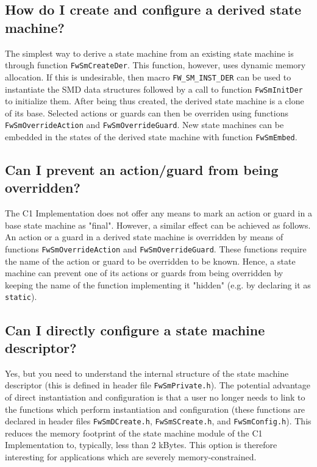 \documentclass[a4paper,10pt]{article}
\begin{document}
\subsection{How do I create and configure a derived state machine?}
The simplest way to derive a state machine from an existing state machine is through function \texttt{FwSmCreateDer}. This function, however, 
uses dynamic memory allocation. If this is undesirable, then macro \texttt{FW\_SM\_INST\_DER} can be used to instantiate the SMD data structures followed 
by a call to function \texttt{FwSmInitDer} to initialize them. After being thus created, the derived state machine is a clone of its base. 
Selected actions or guards can then be overriden using functions \texttt{FwSmOverrideAction} and \texttt{FwSmOverrideGuard}. New state machines can be embedded 
in the states of the derived state machine with function \texttt{FwSmEmbed}.

\subsection{Can I prevent an action/guard from being overridden?}
The C1 Implementation does not offer any means to mark an action or guard in a base state machine as "final". However, a similar effect can be achieved as follows. 
An action or a guard in a derived state machine is overridden by means of functions \texttt{FwSmOverrideAction} and \texttt{FwSmOverrideGuard}. 
These functions require the name of the action or guard to be overridden to be known. Hence, a state machine can prevent one of its actions or guards 
from being overridden by keeping the name of the function implementing it "hidden" (e.g. by declaring it as \texttt{static}).

\subsection{Can I directly configure a state machine descriptor?}
Yes, but you need to understand the internal structure of the state machine descriptor (this is defined in header file \texttt{FwSmPrivate.h}). 
The potential advantage of direct instantiation and configuration is that a user no longer needs to link to the functions which perform instantiation and 
configuration (these functions are declared in header files \texttt{FwSmDCreate.h}, \texttt{FwSmSCreate.h}, and \texttt{FwSmConfig.h}). 
This reduces the memory footprint of the state machine module of the C1 Implementation to, typically, less than 2 kBytes. 
This option is therefore interesting for applications which are severely memory-constrained.
\end{document}
